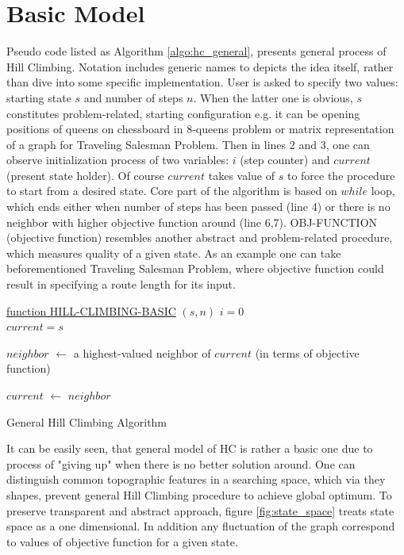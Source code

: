 \documentclass{mini}
\begin{document}
\section{Basic Model}
Pseudo code listed as Algorithm \ref{algo:hc_general}, presents general process of Hill Climbing. Notation includes generic names to depicts the idea itself, rather than dive into some specific implementation. User is asked to specify two values: starting state $s$ and number of steps $n$. When the latter one is obvious, $s$ constitutes problem-related, starting configuration e.g. it can be opening positions of queens on chessboard in 8-queens problem or matrix representation of a graph for Traveling Salesman Problem. Then in lines 2 and 3, one can observe initialization process of two variables: $i$ (step counter) and $current$ (present state holder). Of course $current$ takes value of $s$ to force the procedure to start from a desired state. Core part of the algorithm is based on $while$ loop, which ends either when number of steps has been passed (line 4) or there is no neighbor with higher objective function around (line 6,7). \textsc{OBJ-FUNCTION} (objective function) resembles another abstract and problem-related procedure, which measures quality of a given state. As an example one can take beforementioned Traveling Salesman Problem, where objective function could result in specifying a route length for its input. 

\begin{algorithm}[H]
    \underline{function HILL-CLIMBING-BASIC} $(s, n)$\;
    $i = 0$ \\
    $current = s$ \\
    {
        $neighbor$ $\gets$ a highest-valued neighbor of $current$ (in terms of objective function) \\
        
        {
        }
        
        $current$ $\gets$ $neighbor$
    }
    \caption{General Hill Climbing Algorithm}
    \label{algo:hc_general}
\end{algorithm}

It can be easily seen, that general model of HC is rather a basic one due to process of "giving up" when there is no better solution around. One can distinguish common topographic features in a searching space, which via they shapes, prevent general Hill Climbing procedure to achieve global optimum. To preserve transparent and abstract approach, figure \ref{fig:state_space} treats state space as a one dimensional. In addition any fluctuation of the graph correspond to values of objective function for a given state. 
\end{document}
